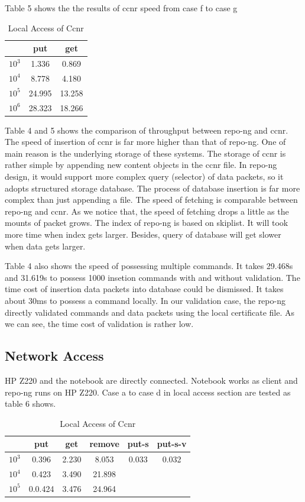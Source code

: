 \documentclass{acm_proc_article-sp}
\begin{document}
Table 5 shows the the results of ccnr speed from case f to case g

\begin{table}
\centering
\begin{tabular}{ | c | c | c | }
    \hline
           & put & get \\ \hline
    $10^3$ & 1.336 & 0.869 \\ \hline
    $10^4$ & 8.778 & 4.180 \\ \hline
    $10^5$ & 24.995 & 13.258 \\ \hline
    $10^6$ & 28.323 & 18.266 \\ \hline
\end{tabular}
\caption{Local Access of Ccnr}
\end{table}

Table 4 and 5 shows the comparison of throughput between repo-ng and ccnr. The speed of insertion of ccnr is far more higher than that of repo-ng. One of main reason is the underlying storage of these systems. The storage of ccnr is rather simple by appending new content objects in the ccnr file. In repo-ng design, it would support more complex query (selector) of data packets, so it adopts structured storage database. The process of database insertion is far more complex than just appending a file. The speed of fetching is comparable between repo-ng and ccnr. As we notice that, the speed of fetching drops a little as the mounts of packet grows. The index of repo-ng is based on skiplist. It will took more time when index gets larger. Besides, query of database will get slower when data gets larger.

Table 4 also shows the speed of possessing multiple commands. It takes 29.468s and 31.619s to possess 1000 insetion commands with and without validation. The time cost of insertion data packets into database could be dismissed. It takes about 30ms to possess a command locally. In our validation case, the repo-ng directly validated commands and data packets using the local certificate file. As we can see, the time cost of validation is rather low.

\subsection{Network Access}
HP Z220 and the notebook are directly connected. Notebook works as client and repo-ng runs on HP Z220. Case a to case d in local access section are tested as table 6 shows.

\begin{table}
\centering
\begin{tabular}{ | c | c | c | c | c | c | }
    \hline
           & put & get & remove & put-s & put-s-v \\ \hline
    $10^3$ & 0.396 & 2.230 & 8.053 & 0.033 & 0.032  \\ \hline
    $10^4$ & 0.423 & 3.490 & 21.898 & & \\ \hline
    $10^5$ & 0.0.424 & 3.476 & 24.964 & & \\ \hline
\end{tabular}
\caption{Local Access of Ccnr}
\end{table}
\end{document}
